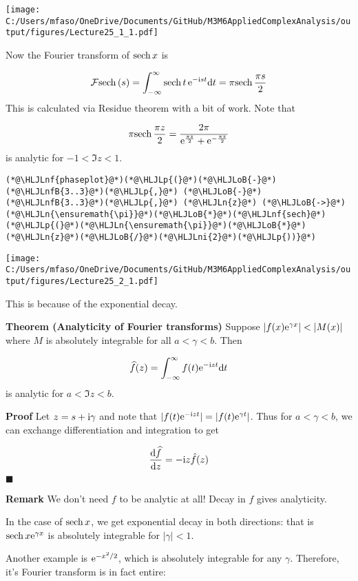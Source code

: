 \documentclass[12pt,landscape]{article}
\newcommand{\HLJLn}[1]{#1}
\newcommand{\HLJLnf}[1]{\textcolor[RGB]{66,102,213}{#1}}
\newcommand{\HLJLnfB}[1]{\textcolor[RGB]{59,151,46}{#1}}
\newcommand{\HLJLni}[1]{\textcolor[RGB]{59,151,46}{#1}}
\newcommand{\HLJLoB}[1]{\textcolor[RGB]{102,102,102}{\textbf{#1}}}
\newcommand{\HLJLp}[1]{#1}
\def\D{ {\rm d} }
\def\I{ {\rm i} }
\def\E{ {\rm e} }
\def\FF{ {\cal F} }
\def\sech{ {\rm sech}\, }
\def\dt{\D t}
\def\dz{\D z}
\def\cent#1{\begin{center}#1\end{center} }
\begin{document}
{\cent{\texttt{[image: C:/Users/mfaso/OneDrive/Documents/GitHub/M3M6AppliedComplexAnalysis/output/figures/Lecture25\_1\_1.pdf]}}

Now the Fourier transform of $\sech x$ is

\[
\FF\sech(s) = \int_{-\infty}^\infty \sech t \, \E^{-\I s t} \dt = \pi \sech{\pi s \over 2}
\]
This is calculated via Residue theorem with a bit of work. Note that

\[
\pi \sech {\pi z \over 2} = {2 \pi \over \E^{\pi z \over 2} + \E^{-{\pi z \over 2}}}
\]
is analytic for $-1 < \Im z < 1$.


\begin{lstlisting}
(*@\HLJLnf{phaseplot}@*)(*@\HLJLp{(}@*)(*@\HLJLoB{-}@*)(*@\HLJLnfB{3..3}@*)(*@\HLJLp{,}@*) (*@\HLJLoB{-}@*)(*@\HLJLnfB{3..3}@*)(*@\HLJLp{,}@*) (*@\HLJLn{z}@*) (*@\HLJLoB{->}@*) (*@\HLJLn{\ensuremath{\pi}}@*)(*@\HLJLoB{*}@*)(*@\HLJLnf{sech}@*)(*@\HLJLp{(}@*)(*@\HLJLn{\ensuremath{\pi}}@*)(*@\HLJLoB{*}@*)(*@\HLJLn{z}@*)(*@\HLJLoB{/}@*)(*@\HLJLni{2}@*)(*@\HLJLp{))}@*)
\end{lstlisting}

\cent{\texttt{[image: C:/Users/mfaso/OneDrive/Documents/GitHub/M3M6AppliedComplexAnalysis/output/figures/Lecture25\_2\_1.pdf]}}

This is because of the exponential decay.

\textbf{Theorem (Analyticity of Fourier transforms)} Suppose $|f(x) \E^{\gamma x}| < |M(x)|$ where $M$ is absolutely integrable for all $a < \gamma < b$. Then

\[
\widehat f(z) = \int_{-\infty}^\infty f(t) \E^{-\I z t} \dt
\]
is analytic for $a < \Im z < b$.

\textbf{Proof} Let $z = s + \I \gamma$ and note that $|f(t) \E^{-\I z t}| = |f(t) \E^{\gamma t}|$. Thus for $a < \gamma < b$, we can exchange differentiation and integration to get

\[
{\D \widehat f \over \dz} = -\I z \hat f(z)
\]
\ensuremath{\blacksquare}

\textbf{Remark} We don't need $f$ to be analytic at all!  Decay in $f$ gives analyticity.

In the case of $\sech x$, we get exponential decay in both directions: that is $\sech x \E^{\gamma x}$ is absolutely integrable for $\vert \gamma \vert < 1$.

Another example is $\E^{-x^2/2}$, which is absolutely integrable for any $\gamma$. Therefore, it's Fourier transform is in fact entire:

}
\end{document}
